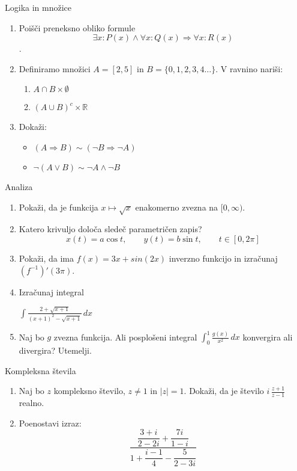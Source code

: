 \begin{frame}{Logika in množice}
	\begin{enumerate}
		\item
		Poišči preneksno obliko formule 
		\[\exists x: P(x) \land \forall x: Q(x) \Rightarrow \forall x: R(x)\].
		\item 
		Definiramo množici $A = [ 2,5 ]$ in $B = \{0, 1, 2, 3, 4 \ldots \}$.
		V ravnino nariši:
		\begin{enumerate}
		   \item $A \cap B \times \emptyset$
		   \item $(A \cup B)^c \times \mathbb{R}$
		\end{enumerate}
		\item
		Dokaži:
		\begin{itemize}
			\item $(A \Rightarrow B) \sim (\lnot B \Rightarrow \lnot A)$
			\item $\lnot (A \lor B) \sim \lnot A \land \lnot B$
		\end{itemize}
	\end{enumerate}
\end{frame}

\begin{frame}{Analiza}
	\begin{enumerate}
		\item
		Pokaži, da je funkcija $x \mapsto \sqrt{x}$ enakomerno zvezna na $[0,\infty)$.
		\item 
		Katero krivuljo določa sledeč parametričen zapis?
		$$
		   x(t) = a \cos t, \qquad %
		   y(t) = b \sin t, \qquad %
		   t \in [0, 2 \pi]
		$$ 
		\item
		Pokaži, da ima $f(x) = 3x + sin(2x)$ inverzno funkcijo in izračunaj $(f^{-1})'(3 \pi)$.
		
		\item
		Izračunaj integral 
		
		$\displaystyle \int \frac{2+\sqrt{x+1}}{(x+1)^2-\sqrt{x+1}} \, dx $
		\item 
		Naj bo $g$ zvezna funkcija. Ali posplošeni integral 
		\( \int_0^1 \frac{g(x)}{x^2} \,dx \)
		konvergira ali divergira? Utemelji.
	\end{enumerate}
\end{frame}

\begin{frame}{Kompleksna števila}
	\begin{enumerate}
		\item
		Naj bo $z$ kompleksno število, $z \ne 1$ in $ \left\lvert z\right\rvert  = 1$.
		Dokaži, da je število \( i \, \frac{z+1}{z-1} \) realno.
		\item
		Poenostavi izraz:
		\[ \frac{\dfrac{3+i}{2-2i} + \dfrac{7i}{1-i}}{1+ \dfrac{i-1}{4} - \dfrac{5}{2-3i}} \]
	\end{enumerate}
\end{frame}